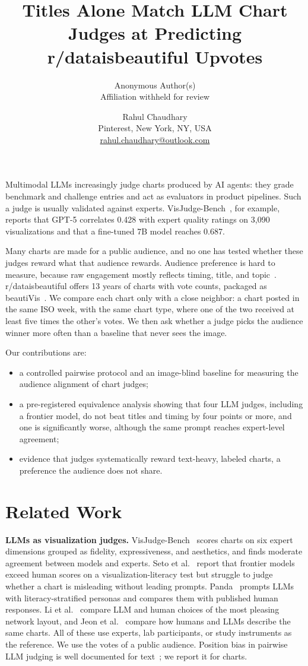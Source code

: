 \documentclass{vgtc}
\title{Titles Alone Match LLM Chart Judges at Predicting r/dataisbeautiful Upvotes}
\author{Anonymous Author(s)\\ \scriptsize Affiliation withheld for review}
\author{Rahul Chaudhary\\ \scriptsize Pinterest, New York, NY, USA \\ \scriptsize \href{mailto:rahul.chaudhary@outlook.com}{rahul.chaudhary@outlook.com}}
\begin{document}
\maketitle

Multimodal LLMs increasingly judge charts produced by AI agents: they grade benchmark and challenge entries and act as evaluators in product pipelines. Such a judge is usually validated against experts. VisJudge-Bench~\cite{xie2026visjudge}, for example, reports that GPT-5 correlates 0.428 with expert quality ratings on 3{,}090 visualizations and that a fine-tuned 7B model reaches 0.687.

Many charts are made for a public audience, and no one has tested whether these judges reward what that audience rewards. Audience preference is hard to measure, because raw engagement mostly reflects timing, title, and topic~\cite{kauer2021public}. r/dataisbeautiful offers 13 years of charts with vote counts, packaged as beautiVis~\cite{lin2026beautivis}. We compare each chart only with a close neighbor: a chart posted in the same ISO week, with the same chart type, where one of the two received at least five times the other's votes. We then ask whether a judge picks the audience winner more often than a baseline that never sees the image.

Our contributions are:
\begin{itemize}
\item a controlled pairwise protocol and an image-blind baseline for measuring the audience alignment of chart judges;
\item a pre-registered equivalence analysis showing that four LLM judges, including a frontier model, do not beat titles and timing by four points or more, and one is significantly worse, although the same prompt reaches expert-level agreement;
\item evidence that judges systematically reward text-heavy, labeled charts, a preference the audience does not share.
\end{itemize}

\section{Related Work}
\textbf{LLMs as visualization judges.} VisJudge-Bench~\cite{xie2026visjudge} scores charts on six expert dimensions grouped as fidelity, expressiveness, and aesthetics, and finds moderate agreement between models and experts. Seto et al.~\cite{seto2026literacy} report that frontier models exceed human scores on a visualization-literacy test but struggle to judge whether a chart is misleading without leading prompts. Panda~\cite{panda2026personas} prompts LLMs with literacy-stratified personas and compares them with published human responses. Li et al.~\cite{li2026beauty} compare LLM and human choices of the most pleasing network layout, and Jeon et al.~\cite{jeon2026llmsee} compare how humans and LLMs describe the same charts. All of these use experts, lab participants, or study instruments as the reference. We use the votes of a public audience. Position bias in pairwise LLM judging is well documented for text~\cite{zheng2023judging}; we report it for charts.
\end{document}
